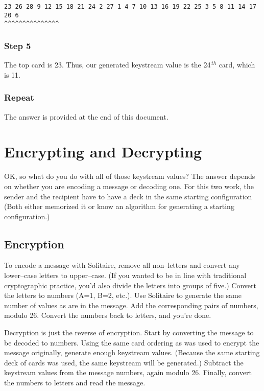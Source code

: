 \documentclass[]{article}
\begin{document}
\begin{verbatim}
23 26 28 9 12 15 18 21 24 2 27 1 4 7 10 13 16 19 22 25 3 5 8 11 14 17 20 6
^^^^^^^^^^^^^^^
\end{verbatim}


\subsubsection*{Step 5}
The top card is 23.  Thus, our generated keystream value is the 
24$^{\, th}$ card, which is 11.


\subsubsection*{Repeat}
  The answer is provided
at the end of this document.


\newpage
\section{Encrypting and Decrypting}
OK, so what do you do with all of those keystream values?  The answer depends
on whether you are encoding a message or decoding one.
For this two work, the sender and the recipient have to have a deck in the same starting configuration (Both either memorized it or know an algorithm for generating a starting configuration.)

\subsection{Encryption}

To encode a message with Solitaire, remove all non--letters and convert
any lower--case letters to upper--case.
(If you wanted to be in line with traditional cryptographic practice,
you'd also divide the letters into groups of five.)
Convert the letters to numbers (A=1, B=2, etc.).  Use
Solitaire to generate the same number of values as are in the message.  Add the corresponding pairs of numbers, modulo 26.  Convert the numbers back to
letters, and you're done.

Decryption is just the reverse of encryption.  Start by converting the 
message to be decoded to numbers.  
Using the same card ordering as was used to encrypt the message
originally, generate enough keystream values.  (Because the same starting
deck of cards was used, the same keystream will be generated.)  Subtract
the keystream values from the message numbers, again modulo 26.  Finally,
convert the numbers to letters and read the message.
\end{document}
